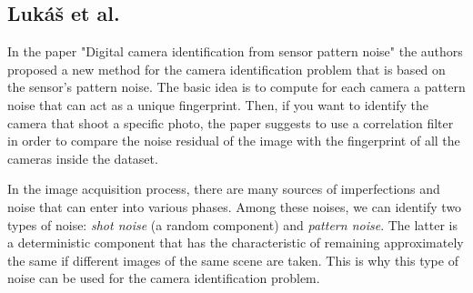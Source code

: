 \subsection{Lukáš et al.}
In the paper "Digital camera identification from sensor pattern noise" the authors proposed a new method for the camera identification problem that is based on the sensor's pattern noise. 
The basic idea is to compute for each camera a pattern noise that can act as a unique fingerprint. Then, if you want to identify the camera that shoot a specific photo, the paper suggests to use a correlation filter in order to compare the noise residual of the image with the fingerprint of all the cameras inside the dataset.

In the image acquisition process, there are many sources of imperfections and noise that can enter into various phases. Among these noises, we can identify two types of noise: \textit{shot noise} (a random component) and \textit{pattern noise}. The latter is a deterministic component that has the characteristic of remaining approximately the same if different images of the same scene are taken. This is why this type of noise can be used for the camera identification problem.
